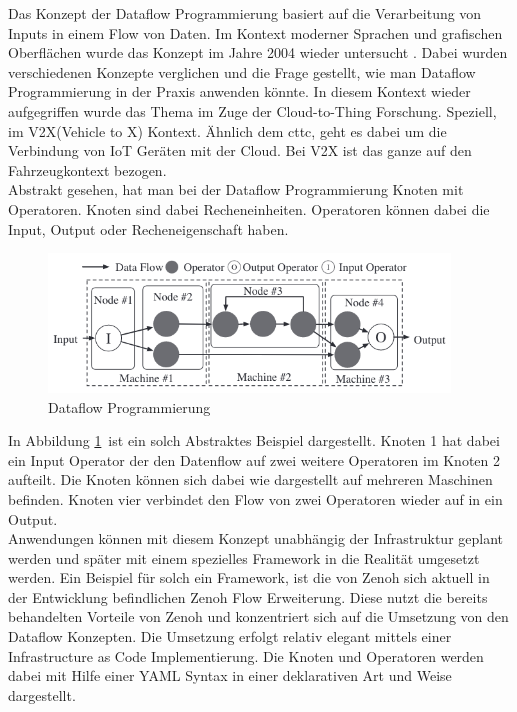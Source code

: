 Das Konzept der Dataflow Programmierung basiert auf die Verarbeitung von Inputs in einem Flow von Daten. Im Kontext moderner Sprachen und grafischen Oberflächen wurde das Konzept im Jahre 2004 wieder untersucht \cite{johnstonAdvancesDataflowProgramming2004}. Dabei wurden verschiedenen Konzepte verglichen und die Frage gestellt, wie man Dataflow Programmierung in der Praxis anwenden könnte. In diesem Kontext wieder aufgegriffen wurde das Thema im Zuge der Cloud-to-Thing Forschung. Speziell, im V2X(Vehicle to X)\cite{baldoniZenohbasedDataflowFramework2021} Kontext. Ähnlich dem \acrlong{cttc}, geht es dabei um die Verbindung von IoT Geräten mit der Cloud. Bei V2X ist das ganze auf den Fahrzeugkontext bezogen.\\
Abstrakt gesehen, hat man bei der Dataflow Programmierung Knoten mit Operatoren. Knoten sind dabei Recheneinheiten. Operatoren können dabei die Input, Output oder Recheneigenschaft haben.

\begin{figure}
  \begin{center}
    \includegraphics[width=0.95\textwidth]{figures/dataflow.png}
  \end{center}
  \caption{Dataflow Programmierung \cite{baldoniZenohbasedDataflowFramework2021}}
  \label{fig:dataflow}
\end{figure}

In Abbildung \ref{fig:dataflow} ist ein solch Abstraktes Beispiel dargestellt. Knoten 1 hat dabei ein Input Operator der den Datenflow auf zwei weitere Operatoren im Knoten 2 aufteilt. Die Knoten können sich dabei wie dargestellt auf mehreren Maschinen befinden. Knoten vier verbindet den Flow von zwei Operatoren wieder auf in ein Output.\\

Anwendungen können mit diesem Konzept unabhängig der Infrastruktur geplant werden und später mit einem spezielles Framework in die Realität umgesetzt werden. Ein Beispiel für solch ein Framework, ist die von Zenoh sich aktuell in der Entwicklung befindlichen Zenoh Flow Erweiterung. Diese nutzt die bereits behandelten Vorteile von Zenoh und konzentriert sich auf die Umsetzung von den Dataflow Konzepten. Die Umsetzung erfolgt relativ elegant mittels einer Infrastructure as Code Implementierung. Die Knoten und Operatoren werden dabei mit Hilfe einer YAML Syntax in einer deklarativen Art und Weise dargestellt. 

